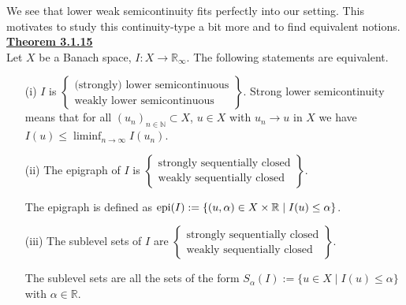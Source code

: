 We see that lower weak semicontinuity fits perfectly into our setting. This motivates to study this continuity-type a bit more and to find equivalent notions.\\[11pt]

\hypertarget{theorem_3_1_15}{\textbf{\underline{Theorem 3.1.15}}}\\
Let $X$ be a Banach space, $I:X\longrightarrow\mathbb{R}_\infty$. The following statements are equivalent.
\begin{itemize}
	\item[(i)] $I$ is $\left\{\begin{array}{l}
		\text{(strongly) lower semicontinuous}\\
		\text{weakly lower semicontinuous}
	\end{array}\right\}$.
	Strong lower semicontinuity means that for all $(u_n)_{n\in\mathbb{N}}\subset X$, $u\in X$ with $u_n\to u$ in $X$ we have $I(u)\leq\liminf_{n\to\infty}{I(u_n)}$.
	\item[(ii)] The epigraph of $I$ is $\left\{\begin{array}{l}
		\text{strongly sequentially closed}\\
		\text{weakly sequentially closed}
	\end{array}\right\}$.

	The epigraph is defined as $\operatorname{epi}\mathopen{}\left(I\right)\mathclose{}:=\{(u,\alpha)\in X\times\mathbb{R}\mid I(u)\leq\alpha\}$.
	\item[(iii)] The sublevel sets of $I$ are $\left\{\begin{array}{l}
		\text{strongly sequentially closed}\\
		\text{weakly sequentially closed}
	\end{array}\right\}$.

	The sublevel sets are all the sets of the form $S_\alpha(I):=\{u\in X\mid I(u)\leq\alpha\}$ with $\alpha\in\mathbb{R}$.\\
\end{itemize}

